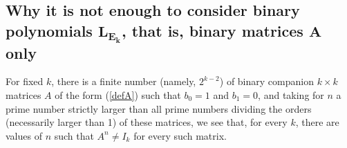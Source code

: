 \documentclass{amsart}
\numberwithin{equation}{section}
\theoremstyle{definition}
\newcommand{\f}{\Bbb F}
\newcommand{\fin}{F_{\text{\rm inv}}}
\begin{document}



\subsection{Why it is not enough to consider binary polynomials $\boldsymbol{L_{E_k}}$, that is, binary matrices $\boldsymbol A$ only}
For fixed $k$, there is a finite number (namely,  $2^{k-2}$) of binary companion $k\times k$ matrices $A$ of the form (\ref{defA}) such that $b_0=1$ and $b_1=0$, and taking for $n$ a prime number strictly larger than all prime numbers dividing the orders (necessarily larger than 1) of these matrices, we see that, for every $k$, there are values of $n$  such that $A^n\neq I_k$ for every such matrix.
\end{document}
